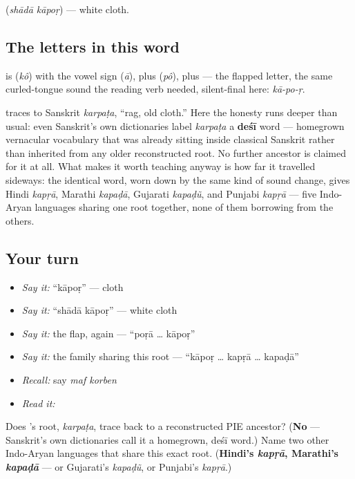   (\emph{shādā kāpoṛ}) — white cloth.

\subsection*{The letters in this word}
\textbf{} is \textbf{} (\emph{kô}) with the vowel sign \textbf{} (\emph{ā}), plus \textbf{} (\emph{pô}), plus \textbf{} — the flapped letter, the same curled-tongue sound the reading verb needed, silent-final here: \emph{kā-po-ṛ}.

\begin{cousinweb}
\textbf{} traces to Sanskrit \emph{karpaṭa}, \textquotedblleft{}rag, old cloth.\textquotedblright{} Here the honesty runs deeper than usual: even Sanskrit's own dictionaries label \emph{karpaṭa} a \textbf{deśī} word — homegrown vernacular vocabulary that was already sitting inside classical Sanskrit rather than inherited from any older reconstructed root. No further ancestor is claimed for it at all. What makes it worth teaching anyway is how far it travelled sideways: the identical word, worn down by the same kind of sound change, gives Hindi \emph{kapṛā}, Marathi \emph{kapaḍā}, Gujarati \emph{kapaḍũ}, and Punjabi \emph{kapṛā} — five Indo-Aryan languages sharing one root together, none of them borrowing from the others.
\end{cousinweb}

\subsection*{Your turn}
\begin{itemize}
\raggedright
  \item \emph{Say it:} \textquotedblleft{}kāpoṛ\textquotedblright{} — cloth
  \item \emph{Say it:} \textquotedblleft{}shādā kāpoṛ\textquotedblright{} — white cloth
  \item \emph{Say it:} the flap, again — \textquotedblleft{}poṛā … kāpoṛ\textquotedblright{}
  \item \emph{Say it:} the family sharing this root — \textquotedblleft{}kāpoṛ … kapṛā … kapaḍā\textquotedblright{}
  \item \emph{Recall:} say \emph{maf korben}
  \item \emph{Read it:} \textbf{}
\end{itemize}

\begin{tcolorbox}[breakable,colback=teal!4,colframe=teal!35!black,title={Before you move on}]
Does 's root, \emph{karpaṭa}, trace back to a reconstructed PIE ancestor? (\textbf{No} — Sanskrit's own dictionaries call it a homegrown, deśī word.) Name two other Indo-Aryan languages that share this exact root. (\textbf{Hindi's \emph{kapṛā}, Marathi's \emph{kapaḍā}} — or Gujarati's \emph{kapaḍũ}, or Punjabi's \emph{kapṛā}.)
\end{tcolorbox}
